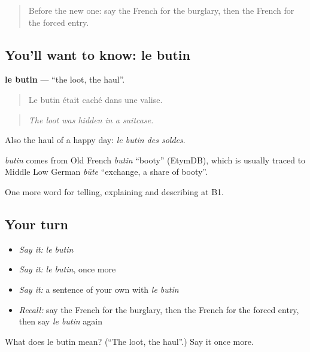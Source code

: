 \label{lesson:FR-C287-butin}



\begin{quote}
Before the new one: say the French for the burglary, then the French for the forced entry.
\end{quote}

\subsection*{You'll want to know: le butin}
\textbf{le butin} — \textquotedblleft{}the loot, the haul\textquotedblright{}.

\begin{quote}
Le butin était caché dans une valise.
\end{quote}

\begin{quote}
\emph{The loot was hidden in a suitcase.}
\end{quote}

Also the haul of a happy day: \emph{le butin des soldes}.

\begin{cousinweb}
\emph{butin} comes from Old French \emph{butin} \textquotedblleft{}booty\textquotedblright{} (EtymDB), which is usually traced to Middle Low German \emph{būte} \textquotedblleft{}exchange, a share of booty\textquotedblright{}.
\end{cousinweb}

\begin{grammarlens}[title={What you've built}]
One more word for telling, explaining and describing at B1.
\end{grammarlens}

\subsection*{Your turn}
\begin{itemize}
\raggedright
  \item \emph{Say it:} \emph{le butin}
  \item \emph{Say it:} \emph{le butin}, once more
  \item \emph{Say it:} a sentence of your own with \emph{le butin}
  \item \emph{Recall:} say the French for the burglary, then the French for the forced entry, then say \emph{le butin} again
\end{itemize}

\begin{tcolorbox}[breakable,colback=teal!4,colframe=teal!35!black,title={Before you move on}]
What does le butin mean? (\textquotedblleft{}The loot, the haul\textquotedblright{}.) Say it once more.
\end{tcolorbox}
